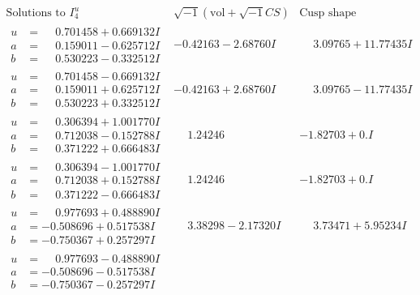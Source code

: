 \documentclass[1p]{elsarticle_modified}
\theoremstyle{definition}
\newcommand{\I}{\sqrt{-1}}
\begin{document}
$$\begin{array}{c|c|c}  
\text{Solutions to }I^u_{4}& \I (\text{vol} + \sqrt{-1}CS) & \text{Cusp shape}\\
 \hline 
\begin{aligned}
u &= \phantom{-}0.701458 + 0.669132 I \\
a &= \phantom{-}0.159011 - 0.625712 I \\
b &= \phantom{-}0.530223 - 0.332512 I\end{aligned}
 & -0.42163 - 2.68760 I & \phantom{-}3.09765 + 11.77435 I \\ \hline\begin{aligned}
u &= \phantom{-}0.701458 - 0.669132 I \\
a &= \phantom{-}0.159011 + 0.625712 I \\
b &= \phantom{-}0.530223 + 0.332512 I\end{aligned}
 & -0.42163 + 2.68760 I & \phantom{-}3.09765 - 11.77435 I \\ \hline\begin{aligned}
u &= \phantom{-}0.306394 + 1.001770 I \\
a &= \phantom{-}0.712038 - 0.152788 I \\
b &= \phantom{-}0.371222 + 0.666483 I\end{aligned}
 & \phantom{-}1.24246\phantom{ +0.000000I} & -1.82703 + 0. I\phantom{ +0.000000I} \\ \hline\begin{aligned}
u &= \phantom{-}0.306394 - 1.001770 I \\
a &= \phantom{-}0.712038 + 0.152788 I \\
b &= \phantom{-}0.371222 - 0.666483 I\end{aligned}
 & \phantom{-}1.24246\phantom{ +0.000000I} & -1.82703 + 0. I\phantom{ +0.000000I} \\ \hline\begin{aligned}
u &= \phantom{-}0.977693 + 0.488890 I \\
a &= -0.508696 + 0.517538 I \\
b &= -0.750367 + 0.257297 I\end{aligned}
 & \phantom{-}3.38298 - 2.17320 I & \phantom{-}3.73471 + 5.95234 I \\ \hline\begin{aligned}
u &= \phantom{-}0.977693 - 0.488890 I \\
a &= -0.508696 - 0.517538 I \\
b &= -0.750367 - 0.257297 I\end{aligned}

\end{array}$$
\end{document}
